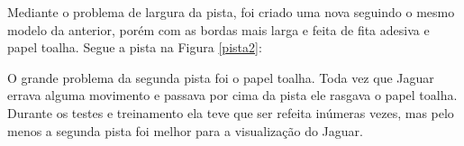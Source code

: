 	\begin{figure}[H]
		\centering
\end{figure}


Mediante o problema de largura da pista, foi criado uma nova seguindo o mesmo modelo da anterior, porém com as bordas mais larga e feita de fita adesiva e papel toalha. Segue a pista na Figura \ref{pista2}:

	\begin{figure}[H]
		\centering
\end{figure}


O grande problema da segunda pista foi o papel toalha. Toda vez que Jaguar errava alguma movimento e passava por cima da pista ele rasgava o papel toalha. Durante os testes e treinamento ela teve que ser refeita inúmeras vezes, mas pelo menos a segunda pista foi melhor para a visualização do Jaguar. 


